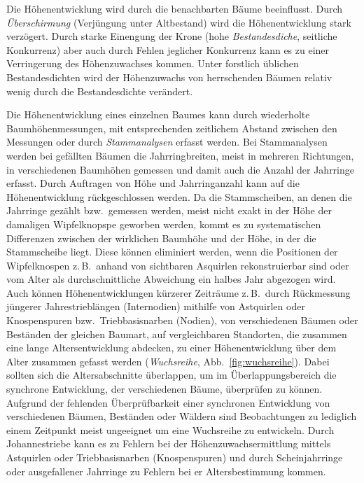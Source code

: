 \documentclass[twocolumn]{scrartcl}
\begin{document}
Die Höhenentwicklung wird durch die benachbarten Bäume beeinflusst. Durch
\emph{Überschirmung} (Verjüngung unter Altbestand) wird die Höhenentwicklung
stark verzögert. Durch starke Einengung der Krone (hohe \emph{Bestandesdiche},
seitliche Konkurrenz) aber auch durch Fehlen jeglicher Konkurrenz kann es zu
einer Verringerung des Höhenzuwachses kommen. Unter forstlich üblichen
Bestandesdichten wird der Höhenzuwachs von herrschenden Bäumen relativ wenig
durch die Bestandesdichte verändert.

Die Höhenentwicklung eines einzelnen Baumes kann durch wiederholte
Baumhöhenmessungen, mit entsprechenden zeitlichem Abstand zwischen den Messungen
oder durch \emph{Stammanalysen} erfasst werden. Bei
Stammanalysen werden bei gefällten Bäumen die Jahrringbreiten, meist in mehreren
Richtungen, in verschiedenen Baumhöhen gemessen und damit auch die Anzahl der
Jahrringe erfasst. Durch Auftragen von Höhe und Jahrringanzahl kann auf die
Höhenentwicklung rückgeschlossen werden. Da die Stammscheiben, an denen die
Jahrringe gezählt bzw.\ gemessen werden, meist nicht exakt in der Höhe der
damaligen Wipfelknopspe geworben werden, kommt es zu systematischen Differenzen
zwischen der wirklichen Baumhöhe und der Höhe, in der die Stammscheibe liegt.
Diese können eliminiert werden, wenn die Positionen der Wipfelknospen z.\,B.\
anhand von sichtbaren Asquirlen rekonstruierbar sind oder vom Alter als
durchschnittliche Abweichung ein halbes Jahr abgezogen wird. Auch können
Höhenentwicklungen kürzerer Zeiträume z.\,B.\ durch Rückmessung jüngerer
Jahrestrieblängen (Internodien) mithilfe von Astquirlen oder Knospenspuren bzw.\
Triebbasisnarben (Nodien),  von verschiedenen Bäumen oder Beständen der gleichen
Baumart, auf vergleichbaren Standorten, die zusammen eine lange
Altersentwicklung abdecken, zu einer Höhenentwicklung über dem Alter zusammen
gefasst werden (\emph{Wuchsreihe}\index{Wuchsreihe}, Abb.~\ref{fig:wuchsreihe}).
Dabei sollten sich die Altersabschnitte überlappen, um im Überlappungsbereich
die synchrone Entwicklung, der verschiedenen Bäume, überprüfen zu können.
Aufgrund der fehlenden Überprüfbarkeit einer synchronen Entwicklung von
verschiedenen Bäumen, Beständen oder Wäldern sind Beobachtungen zu lediglich
einem Zeitpunkt meist ungeeignet um eine Wuchsreihe zu entwickeln. Durch
Johannestriebe kann es zu Fehlern bei der Höhenzuwachsermittlung mittels
Astquirlen oder Triebbasisnarben (Knospenspuren) und durch Scheinjahrringe oder
ausgefallener Jahrringe zu Fehlern bei er Altersbestimmung kommen.
\end{document}
